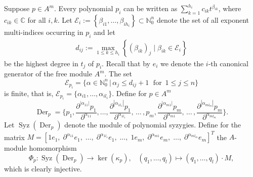 \documentclass[a4paper,10pt]{article}
\theoremstyle{nonumberplain}
\newcommand{\C}{\mathbb{C}}
\newcommand{\N}{\mathbb{N}}
\DeclareMathOperator{\Der}{Der}
\DeclareMathOperator{\Syz}{Syz}
\begin{document}
Suppose $p \in A^m$. Every polynomial $p_i$ can be written as 
$\sum_{k=1}^{h_i}c_{ik}t^{\beta_{ik}}$, 
where $c_{ik} \in \C$ for all $i,k$. Let 
$\mathcal{E}_i:=\left\lbrace \beta_{i1}, \dots, 
\beta_{ih_i} \right\rbrace \subset \N_0^n$ denote the set of all 
exponent multi-indices occurring in $p_i$ and let
\begin{eqnarray}\label{expo}
d_{ij}:=\max_{1\leq k \leq h_i} \left\lbrace (\beta_{ik})_j \; | \; \beta_{ik} \in 
\mathcal{E}_i \right\rbrace 
\end{eqnarray}
be the highest degree in $t_j$ of $p_i$. Recall that by $e_i$ we denote the $i$-th canonical 
generator of the free module $A^m$. The set 
$$
\mathcal{E}_{p_i}=\{ \alpha \in {\N}_0^n \, | \, \alpha_j \leq d_{ij}+1 \; \mbox{ for } \, 1\leq j \leq n \}
$$
is finite, that is, $\mathcal{E}_{p_i} = \lbrace \alpha_{i1}, \dots, \alpha_{il_i} \rbrace$.
Define for $p\in A^m$
$$ \Der_p=\lbrace p_1, \frac{\partial^{|\alpha_{11}|}p_1}{\partial^{\alpha_{11}}}, 
\dots,\frac{\partial^{|\alpha_{1l_1}|}p_1}{\partial^{\alpha_{1l_1}}}, \, \dots \, , p_m, 
\frac{\partial^{|\alpha_{m1}|}p_m}{\partial^{\alpha_{m1}}}, \, \dots \,, 
\frac{\partial^{|\alpha_{ml_m}|}p_m}{\partial^{\alpha_{ml_m}}} \rbrace.$$
Let $\Syz(\Der_p)$ denote the module of polynomial syzygies.
Define for the matrix
$M=[ 1 e_1, \; \partial^{\alpha_{11}} e_1, \; \dots, \;
\partial^{\alpha_{1l_1}}e_1, \; \dots, \; 1 e_m, \; \partial^{\alpha_{m1}}e_m, \;
\dots, \; \partial^{\alpha_{ml_m}} e_m]^T$
the $A$-module homomorphism 
$$\Phi_p:\Syz(\Der_p) \rightarrow \ker(\kappa_p), \;\;\; (q_1, \dots, q_l) \mapsto  (q_1, \dots, q_l) \cdot M, 
$$
which is clearly injective. 
\end{document}
